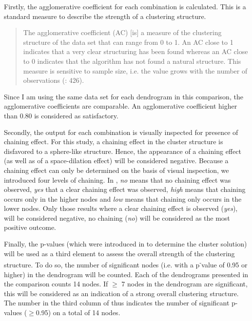 Firstly, the agglomerative coefficient for each combination is calculated. This is a standard measure to describe the strength of a clustering structure.


\begin{quote}
The agglomerative coefficient (AC) [is] a measure of the clustering structure of the data set that can range from 0 to 1. An AC close to 1 indicates that a very clear structuring has been found whereas an AC close to 0 indicates that the algorithm has not found a natural structure. This measure is sensitive to sample size, i.e. the value grows with the number of observations (\citealt{glynn_cluster_2014}: 426).
\end{quote}


Since I am using the same data set for each dendrogram in this comparison, the agglomerative coefficients are comparable. An agglomerative coefficient higher than 0.80 is considered as satisfactory.



Secondly, the output for each combination is visually inspected for presence of chaining effect. For this study, a chaining effect in the cluster structure is disfavored to a sphere-like structure. Hence, the appearance of a chaining effect (as well as of a space-dilation effect) will be considered negative. Because a chaining effect can only be determined on the basis of visual inspection, we introduced four levels of chaining. In , \textit{no} means that no chaining effect was observed, \textit{yes} that a clear chaining effect was observed, \textit{high} means that chaining occurs only in the higher nodes and \textit{low} means that chaining only occurs in the lower nodes. Only those results where a clear chaining effect is observed (\textit{yes}), will be considered negative, no chaining (\textit{no}) will be considered as the most positive outcome.



Finally, the p-values (which were introduced in  to determine the cluster solution) will be used as a third element to assess the overall strength of the clustering structure. To do so, the number of significant nodes (i.e. with a p\textsuperscript{{}-}value of 0.95 or higher) in the dendrogram will be counted. Each of the dendrograms presented in the comparison counts 14 nodes. If ${\geq}$ 7 nodes in the dendrogram are significant, this will be considered as an indication of a strong overall clustering structure. The number in the third column of  thus indicates the number of significant p-values (${\geq}$0.95) on a total of 14 nodes.


